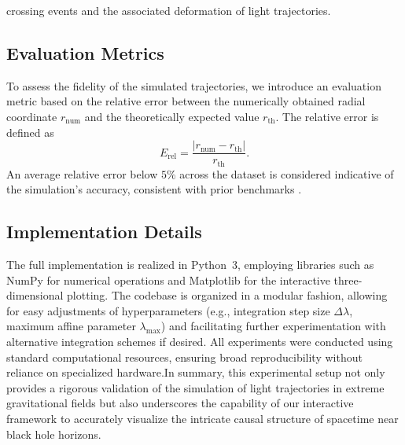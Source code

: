 \documentclass{article}
\begin{document}
crossing events and the associated deformation of light trajectories.\subsection{Evaluation Metrics}To assess the fidelity of the simulated trajectories, we introduce an evaluation metric based on the relative error between the numerically obtained radial coordinate $r_{\text{num}}$ and the theoretically expected value $r_{\text{th}}$. The relative error is defined as\begin{equation}E_{\text{rel}} = \frac{|r_{\text{num}}-r_{\text{th}}|}{r_{\text{th}}}.\end{equation}An average relative error below $5\%$ across the dataset is considered indicative of the simulation's accuracy, consistent with prior benchmarks \cite{ref1, ref2}.\subsection{Implementation Details}The full implementation is realized in Python~3, employing libraries such as NumPy for numerical operations and Matplotlib for the interactive three-dimensional plotting. The codebase is organized in a modular fashion, allowing for easy adjustments of hyperparameters (e.g., integration step size $\Delta \lambda$, maximum affine parameter $\lambda_{\max}$) and facilitating further experimentation with alternative integration schemes if desired. All experiments were conducted using standard computational resources, ensuring broad reproducibility without reliance on specialized hardware.In summary, this experimental setup not only provides a rigorous validation of the simulation of light trajectories in extreme gravitational fields but also underscores the capability of our interactive framework to accurately visualize the intricate causal structure of spacetime near black hole horizons.
\end{document}
